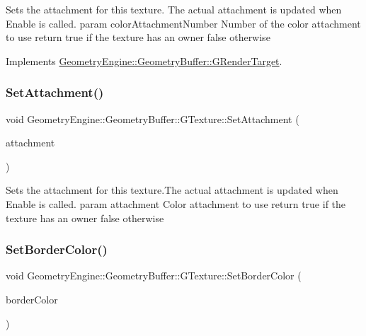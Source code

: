Sets the attachment for this texture. The actual attachment is updated when Enable is called. param color\+Attachment\+Number Number of the color attachment to use return true if the texture has an owner false otherwise 

Implements \mbox{\hyperlink{class_geometry_engine_1_1_geometry_buffer_1_1_g_render_target_a1031c44ad374654e2183d3b1b99638a3}{Geometry\+Engine\+::\+Geometry\+Buffer\+::\+G\+Render\+Target}}.

\mbox{\label{class_geometry_engine_1_1_geometry_buffer_1_1_g_texture_a1dc99966bc21411656dc776d429b377d}} 
\subsubsection{\texorpdfstring{SetAttachment()}{SetAttachment()}\hspace{0.1cm}{\footnotesize\ttfamily [2/2]}}
{\footnotesize\ttfamily void Geometry\+Engine\+::\+Geometry\+Buffer\+::\+G\+Texture\+::\+Set\+Attachment (\begin{DoxyParamCaption}\item[{G\+Framebuffer\+Commons\+::\+G\+\_\+\+C\+O\+L\+O\+R\+\_\+\+A\+T\+T\+A\+C\+H\+M\+E\+N\+TS}]{attachment }\end{DoxyParamCaption})}

Sets the attachment for this texture.\+The actual attachment is updated when Enable is called. param attachment Color attachment to use return true if the texture has an owner false otherwise \mbox{\label{class_geometry_engine_1_1_geometry_buffer_1_1_g_texture_a458a06591fb47ea1c3246af4c9bae344}} 
\subsubsection{\texorpdfstring{SetBorderColor()}{SetBorderColor()}}
{\footnotesize\ttfamily void Geometry\+Engine\+::\+Geometry\+Buffer\+::\+G\+Texture\+::\+Set\+Border\+Color (\begin{DoxyParamCaption}\item[{const Q\+Vector3D \&}]{border\+Color }\end{DoxyParamCaption})}

